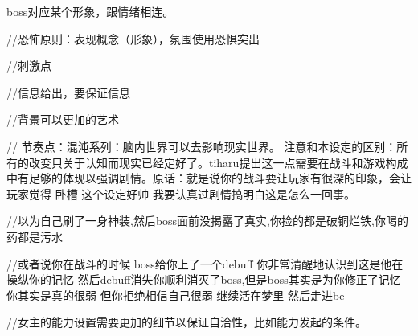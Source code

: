 \documentclass[12pt, a4paper]{article}
\begin{document}
        boss对应某个形象，跟情绪相连。

        //恐怖原则：表现概念（形象），氛围使用恐惧突出

        //刺激点
        
        //信息给出，要保证信息

        //背景可以更加的艺术

        // 节奏点：混沌系列：脑内世界可以去影响现实世界。 注意和本设定的区别：所有的改变只关于认知而现实已经定好了。tiharu提出这一点需要在战斗和游戏构成中有足够的体现以强调剧情。原话：就是说你的战斗要让玩家有很深的印象，会让玩家觉得 卧槽 这个设定好帅 我要认真过剧情搞明白这是怎么一回事。

        //以为自己刷了一身神装,然后boss面前没揭露了真实,你捡的都是破铜烂铁,你喝的药都是污水

        //或者说你在战斗的时候 boss给你上了一个debuff 你非常清醒地认识到这是他在操纵你的记忆 然后debuff消失你顺利消灭了boss,但是boss其实是为你修正了记忆 你其实是真的很弱 但你拒绝相信自己很弱 继续活在梦里 然后走进be

        //女主的能力设置需要更加的细节以保证自洽性，比如能力发起的条件。
\end{document}

